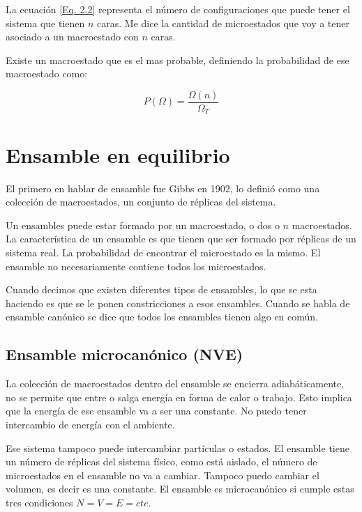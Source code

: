 \documentclass[11pt,fleqn]{book}
\begin{document}
La ecuación \ref{Eq. 2.2} representa el número de configuraciones que puede tener el sistema que tienen $n$ caras. Me dice la cantidad de microestados que voy a tener asociado a un macroestado con $n$ caras.


Existe un macroestado que es el mas probable, definiendo la probabilidad de ese macroestado como:

\begin{equation}
     P(\Omega)=\frac{\Omega(n)}{\Omega_{T}}
     \label{Eq. 2.3}
\end{equation}

\section{Ensamble en equilibrio}

El primero en hablar de ensamble fue Gibbs en 1902, lo definió como una colección de macroestados, un conjunto de réplicas del sistema. 


Un ensambles puede estar formado por un macroestado, o dos o $n$ macroestados. La característica de un ensamble es que tienen que ser formado por réplicas de un sistema real. La probabilidad de encontrar el microestado es la mismo. El ensamble no necesariamente contiene todos los microestados.

Cuando decimos que existen diferentes tipos de ensambles, lo que se esta haciendo es que se le ponen constricciones a esos ensambles. Cuando se habla de ensamble canónico se dice que todos los ensambles tienen algo en común.

\subsection{Ensamble microcanónico (NVE)}

La colección de macroestados dentro del ensamble se encierra adiabáticamente, no se permite que entre o salga energía en forma de calor o trabajo. Esto implica que la energía de ese ensamble va a ser una constante. No puedo tener intercambio de energía con el ambiente.


Ese sistema tampoco puede intercambiar partículas o estados. El ensamble tiene un número de réplicas del sistema físico, como está aislado, el número de microestados en el ensamble no va a cambiar. Tampoco puedo cambiar el volumen, es decir es una constante. El ensamble es microcanónico si cumple estas tres condiciones $N=V=E=cte$.
\end{document}
